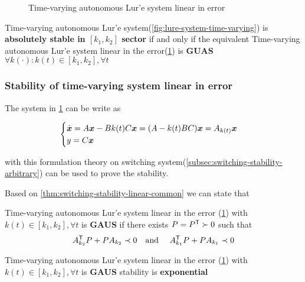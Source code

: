 \begin{figure}[htb]
    \centering
    \caption{Time-varying autonomous Lur'e system linear in error}
    \label{fig:lure-system-time-varying-linear}
\end{figure}

\begin{theorem}
    Time-varying autonomous Lur'e system(\cref{fig:lure-system-time-varying}) is \textbf{absolutely stable in $[k_1,k_2]$ sector}
    if and only if the equivalent Time-varying autonomous Lur'e system linear in the error(\cref{fig:lure-system-time-varying-linear})
    is \textbf{GUAS} $\forall k(\cdot) : k(t) \in [k_1,k_2], \forall t$
\end{theorem}

\subsubsection{Stability of time-varying system linear in error}

The system in \cref{fig:lure-system-time-varying-linear} can be write as

\[
    \begin{cases}
        \dot{\boldsymbol{x}} = A \boldsymbol{x} - B k(t) C\boldsymbol{x} = (A - k(t) B C) \boldsymbol{x} = A_{k(t)} \boldsymbol{x} \\
        y = C \boldsymbol{x}
    \end{cases}
\]

with this formulation theory on switching system(\cref{subsec:switching-stability-arbitrary}) can be used to prove the stability.

Based on \cref{thm:switching-stability-linear-common} we can state that

\begin{theorem}
    Time-varying autonomous Lur'e system linear in the error (\cref{fig:lure-system-time-varying-linear}) with $k(t) \in [k_1,k_2], \forall t$
    is \textbf{GAUS} if there exists  $P=P^{\mathsf{T}} \succ 0$ such that
    \[
        A_{k_2}^{\mathsf{T}} P + P A_{k_2} \prec 0 \text{\quad and \quad}
        A_{k_1}^{\mathsf{T}} P + P A_{k_1} \prec 0
    \]
\end{theorem}

\begin{corollary}
    Time-varying autonomous Lur'e system linear in the error (\cref{fig:lure-system-time-varying-linear}) with $k(t) \in [k_1,k_2], \forall t$ is \textbf{GAUS} stability is \textbf{exponential}
\end{corollary}
